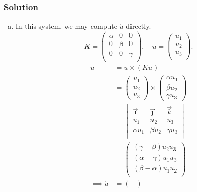 \documentclass[12pt]{article}
\begin{document}
\subsubsection*{Solution}
\begin{enumerate}[(a)]
\item In this system, we may compute $\dot{u}$ directly.
  \begin{equation*}
    K =
    \begin{pmatrix}
      \alpha & 0 & 0 \\
      0 & \beta & 0 \\
      0 & 0 & \gamma \\
    \end{pmatrix},
    \quad u = \begin{pmatrix} u_1 \\ u_2 \\ u_3 \\ \end{pmatrix}.
  \end{equation*}
  \begin{equation*}
    \begin{aligned}
      \dot{u} &= u \times (Ku) \\
      &= \begin{pmatrix} u_1 \\ u_2 \\ u_3 \end{pmatrix} \times
      \begin{pmatrix} \alpha u_1 \\ \beta u_2 \\ \gamma u_3 \end{pmatrix} \\
      &= \begin{vmatrix}
        \vec{\imath} & \vec{\jmath} & \vec{k} \\
        u_1 & u_2 & u_3 \\
        \alpha u_1 & \beta u_2 & \gamma u_3 \\
      \end{vmatrix} \\
      &=
      \begin{pmatrix}
        (\gamma-\beta)u_2u_3 \\
        (\alpha-\gamma)u_1u_3 \\
        (\beta-\alpha)u_1u_2 \\
      \end{pmatrix} \\
      \implies \dot{u} &=
      \begin{pmatrix}

\end{pmatrix}
\end{aligned}
\end{equation*}
\end{enumerate}
\end{document}
